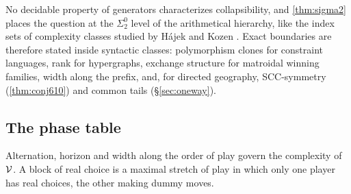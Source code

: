 No decidable property of generators characterizes collapsibility, and \cref{thm:sigma2} places the question at the $\Sigma^0_2$ level of the arithmetical hierarchy, like the index sets of complexity classes studied by H\'ajek \cite{Hajek} and Kozen \cite{Kozen}. Exact boundaries are therefore stated inside syntactic classes: polymorphism clones for constraint languages, rank for hypergraphs, exchange structure for matroidal winning families, width along the prefix, and, for directed geography, SCC-symmetry (\cref{thm:conj610}) and common tails (\S\ref{sec:oneway}).

\subsection{The phase table}\label{ssec:phase}
Alternation, horizon and width along the order of play govern the complexity of $\mathcal{V}$. A block of real choice is a maximal stretch of play in which only one player has real choices, the other making dummy moves.

